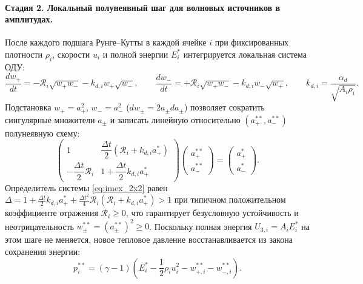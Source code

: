 \documentclass[11pt,a4paper]{article}
\begin{document}
\paragraph{Стадия 2. Локальный полунеявный шаг для волновых источников в амплитудах.}
После каждого подшага Рунге--Кутты в каждой ячейке $i$ при фиксированных плотности $\rho_i$, скорости $u_i$ и полной энергии $E_i^*$ интегрируется локальная система ОДУ:
\begin{equation}
\frac{dw_+}{dt} = -\mathcal{R}_i\sqrt{w_+ w_-} - k_{d,i} w_+\sqrt{w_-}, \qquad
\frac{dw_-}{dt} = +\mathcal{R}_i\sqrt{w_+ w_-} - k_{d,i} w_-\sqrt{w_+}, \qquad k_{d,i} = \frac{\alpha_d}{\sqrt{A_i\rho_i}}.
\label{eq:local_wave_ode}
\end{equation}
Подстановка $w_+ = a_+^2$, $w_- = a_-^2$ ($dw_\pm = 2a_\pm da_\pm$) позволяет сократить сингулярные множители $a_\pm$ и записать линейную относительно $(a_+^{**}, a_-^{**})$ полунеявную схему:
\begin{equation}
\begin{pmatrix}
1 & \dfrac{\Delta t}{2}\left(\mathcal{R}_i + k_{d,i} a_+^*\right) \\[8pt]
-\dfrac{\Delta t}{2}\mathcal{R}_i & 1 + \dfrac{\Delta t}{2}k_{d,i} a_+^*
\end{pmatrix}
\begin{pmatrix}
a_+^{**} \\[6pt]
a_-^{**}
\end{pmatrix} =
\begin{pmatrix}
a_+^* \\[6pt]
a_-^*
\end{pmatrix}.
\label{eq:imex_2x2}
\end{equation}
Определитель системы \eqref{eq:imex_2x2} равен $\Delta = 1 + \frac{\Delta t}{2}k_{d,i}a_+^* + \frac{\Delta t^2}{4}\mathcal{R}_i(\mathcal{R}_i + k_{d,i}a_+^*) > 1$ при типичном положительном коэффициенте отражения $\mathcal{R}_i \ge 0$, что гарантирует безусловную устойчивость и неотрицательность $w_\pm^{**} = (a_\pm^{**})^2 \ge 0$. Поскольку полная энергия $U_{3,i} = A_i E_i^*$ на этом шаге не меняется, новое тепловое давление восстанавливается из закона сохранения энергии:
\[
p_i^{**} = (\gamma - 1)\left(E_i^* - \frac{1}{2}\rho_i u_i^2 - w_{+,i}^{**} - w_{-,i}^{**}\right).
\]
\end{document}
